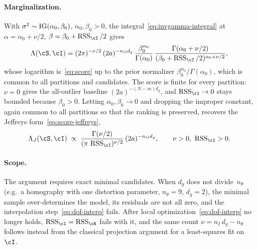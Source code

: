 \paragraph{Marginalization.}
With $\sigma^2 \sim \mathrm{IG}(\alpha_0, \beta_0)$, $\alpha_0, \beta_0 > 0$,
the \invgamma integral~\eqref{eq:invgamma-integral} at
$\alpha = \alpha_0 + \nu/2$, $\beta = \beta_0 + \RSS_\cI/2$ gives
\begin{equation}
	\Lambda(\cS, \cI)
	= (2\pi)^{-\nu/2}\,(2a)^{-n_O d_g}\,
	\frac{\beta_0^{\alpha_0}}{\Gamma(\alpha_0)}\,
	\frac{\Gamma(\alpha_0 + \nu/2)}
	{(\beta_0 + \RSS_\cI/2)^{\alpha_0 + \nu/2}},
	\label{eq:dof-marginal}
\end{equation}
whose logarithm is~\eqref{eq:score} up to the prior normalizer
$\beta_0^{\alpha_0}/\Gamma(\alpha_0)$, which is common to all
partitions and candidates.  The score is finite for every partition:
$\nu = 0$ gives the all-outlier baseline $(2a)^{-(N-m)d_g}$, and
$\RSS_\cI \to 0$ stays bounded because $\beta_0 > 0$.  Letting
$\alpha_0, \beta_0 \to 0$ and dropping the improper constant, again
common to all partitions so that the ranking is preserved, recovers
the Jeffreys form~\eqref{eq:score-jeffreys},
\begin{equation}
	\Lambda_J(\cS, \cI) \;\propto\;
	\frac{\Gamma(\nu/2)}{(\pi\,\RSS_\cI)^{\nu/2}}\,(2a)^{-n_O d_g},
	\qquad \nu > 0,\ \RSS_\cI > 0.
\end{equation}

\paragraph{Scope.}
The argument requires exact minimal candidates.  When $d_g$ does not
divide~$n_\theta$ (e.g.\ a homography with one distortion parameter,
$n_\theta = 9$, $d_g = 2$), the minimal sample over-determines
the model, its residuals are not all zero, and the interpolation
step~\eqref{eq:dof-interp} fails.  After local
optimization~\eqref{eq:dof-interp} no longer holds, $\RSS_\cI =
\RSS_\cR$ fails with it, and the same count $\nu = n_I\,d_g -
n_\theta$ follows instead from the classical projection argument for
a least-squares fit on~$\cI$.
